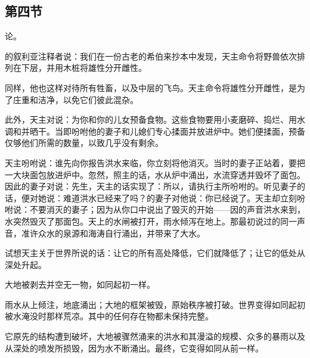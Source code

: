 
\subsection{第四节}

论。\par

的叙利亚注释者说：我们在一份古老的希伯来抄本中发现，天主命令将野兽依次排列在下层，并用木桩将雄性分开雌性。\par

同样，他也这样对待所有牲畜，以及中层的飞鸟。天主命令将雄性分开雌性，是为了庄重和洁净，以免它们彼此混杂。\par

此外，天主对说：为你和你的儿女预备食物。这些食物要用小麦磨碎、捣烂、用水调和并晒干。当即吩咐他的妻子和儿媳们专心揉面并放进炉中。她们便揉面，预备仅够他们所需的数量，以致几乎没有剩余。\par

天主吩咐说：谁先向你报告洪水来临，你立刻将他消灭。当时的妻子正站着，要把一大块面包放进炉中。忽然，照主的话，水从炉中涌出，水流穿透并毁坏了面包。因此的妻子对说：先生，天主的话实现了：所以，请执行主所吩咐的。听见妻子的话，便对她说：难道洪水已经来了吗？的妻子对他说：你已经说了。天主却立刻吩咐说：不要消灭的妻子；因为从你口中说出了毁灭的开始——因的声音洪水来到，水突然毁灭了那面包。天上的水闸被打开，雨水倾泻在地上。那最初说过的同一声音，准许众水的泉源和海涛自行涌出，并带来了大水。\par

试想天主关于世界所说的话：让它的所有高处降低，它们就降低了；让它的低处从深处升起。\par

大地被剥去并空无一物，如同起初一样。\par

雨水从上倾注，地底涌出；大地的框架被毁，原始秩序被打破。世界变得如同起初被水淹没时那样荒凉。其中的任何存在物都未保持完整。\par

它原先的结构遭到破坏，大地被骤然涌来的洪水和其漫溢的规模、众多的暴雨以及从深处的喷发所损毁，因为水不断涌出。最终，它变得如同从前一样。\par

